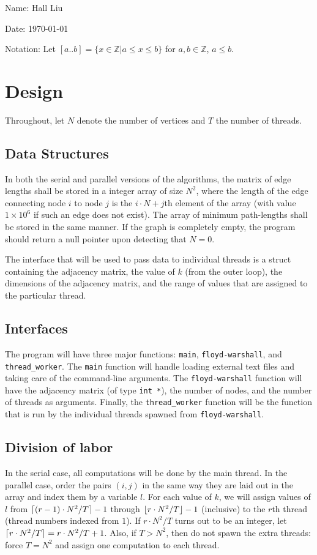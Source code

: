 \documentclass{article}
\newcommand{\zn}{\mathbb{Z}}
\DeclarePairedDelimiter\ceil{\lceil}{\rceil}
\DeclarePairedDelimiter\floor{\lfloor}{\rfloor}
\begin{document}
Name: Hall Liu

Date: \today 
\vspace{20pt}

\noindent Notation: Let $[a..b]=\{x\in\zn|a\leq x\leq b\}$ for $a,b\in\zn$, $a\leq b$.
\section*{Design}
Throughout, let $N$ denote the number of vertices and $T$ the number of threads.
\subsection*{Data Structures}
In both the serial and parallel versions of the algorithms, the matrix of edge lengths shall be stored in a integer array of size $N^2$, where the length of the edge connecting node $i$ to node $j$ is the $i\cdot N+j$th element of the array (with value $1\times10^6$ if such an edge does not exist). The array of minimum path-lengths shall be stored in the same manner. If the graph is completely empty, the program should return a null pointer upon detecting that $N=0$.

The interface that will be used to pass data to individual threads is a struct containing the adjacency matrix, the value of $k$ (from the outer loop), the dimensions of the adjacency matrix, and the range of values that are assigned to the particular thread.
\subsection*{Interfaces}
The program will have three major functions: \verb|main|, \verb|floyd-warshall|, and \verb|thread_worker|. The \verb|main| function will handle loading external text files and taking care of the command-line arguments. The \verb|floyd-warshall| function will have the adjacency matrix (of type \verb|int *|), the number of nodes, and the number of threads as arguments. Finally, the \verb|thread_worker| function will be the function that is run by the individual threads spawned from \verb|floyd-warshall|.
\subsection*{Division of labor}
In the serial case, all computations will be done by the main thread. In the parallel case, order the pairs $(i,j)$ in the same way they are laid out in the array and index them by a variable $l$. For each value of $k$, we will assign values of $l$ from $\ceil{(r-1)\cdot N^2/T}-1$ through $\floor{r\cdot N^2/T}-1$ (inclusive) to the $r$th thread (thread numbers indexed from $1$). If $r\cdot N^2/T$ turns out to be an integer, let $\ceil{r\cdot N^2/T}=r\cdot N^2/T + 1$. Also, if $T>N^2$, then do not spawn the extra threads: force $T=N^2$ and assign one computation to each thread.
\end{document}
